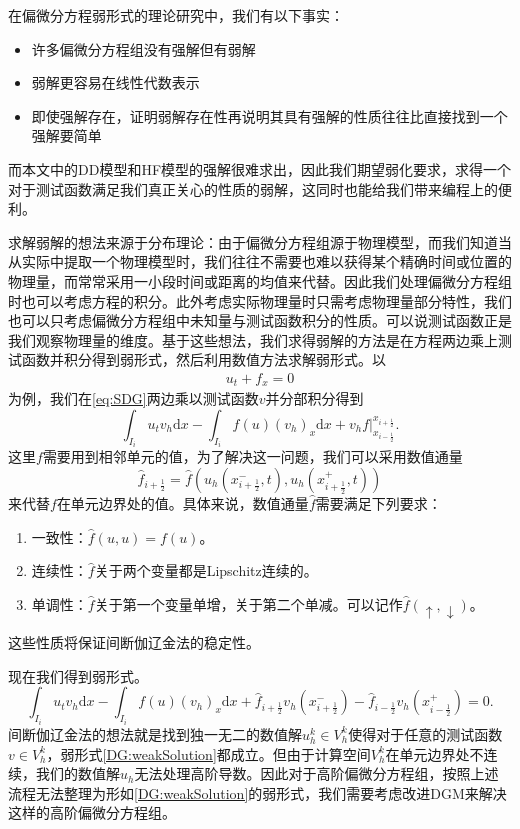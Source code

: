 在偏微分方程弱形式的理论研究中，我们有以下事实\cite{sullivan2020brief}：
\begin{itemize}
    \item 许多偏微分方程组没有强解但有弱解
    \item 弱解更容易在线性代数表示
    \item 即使强解存在，证明弱解存在性再说明其具有强解的性质往往比直接找到一个强解要简单
\end{itemize}
而本文中的DD模型和HF模型的强解很难求出，因此我们期望弱化要求，求得一个对于测试函数满足我们真正关心的性质的弱解，这同时也能给我们带来编程上的便利。

求解弱解的想法来源于分布理论：由于偏微分方程组源于物理模型，而我们知道当从实际中提取一个物理模型时，我们往往不需要也难以获得某个精确时间或位置的物理量，而常常采用一小段时间或距离的均值来代替。因此我们处理偏微分方程组时也可以考虑方程的积分。此外考虑实际物理量时只需考虑物理量部分特性，我们也可以只考虑偏微分方程组中未知量与测试函数积分的性质。可以说测试函数正是我们观察物理量的维度。基于这些想法，我们求得弱解的方法是在方程两边乘上测试函数并积分得到弱形式，然后利用数值方法求解弱形式。以
\begin{align}
    u_t + f_x = 0\label{eq:SDG}
\end{align}
为例，我们在\eqref{eq:SDG}两边乘以测试函数$v$并分部积分得到
\begin{equation}
    \int_{I_i}u_t v_h\mathrm{d}x - \int_{I_i}f(u)(v_h)_x\mathrm{d}x+v_hf\bigg|^{x_{i+\frac{1}{2}}}_{x_{i-\frac{1}{2}}}.
\end{equation}
这里$f$需要用到相邻单元的值，为了解决这一问题，我们可以采用数值通量
\begin{equation*}
    \hat{f}_{i+\frac{1}{2}}=\hat{f}(u_h(x^-_{i+\frac{1}{2}},t),u_h(x^+_{i+\frac{1}{2}},t))
\end{equation*}
来代替$f$在单元边界处的值。具体来说，数值通量$\hat{f}$需要满足下列要求：
\begin{enumerate}
    \item 一致性：$\hat{f}(u,u)=f(u)$。
    \item 连续性：$\hat{f}$关于两个变量都是Lipschitz连续的。
    \item 单调性：$\hat{f}$关于第一个变量单增，关于第二个单减。可以记作$\hat{f}(\uparrow,\downarrow)$。
\end{enumerate}
这些性质将保证间断伽辽金法的稳定性。

现在我们得到弱形式。
\begin{equation}
    \int_{I_i}u_t v_h\mathrm{d}x - \int_{I_i}f(u)(v_h)_x\mathrm{d}x+\hat{f}_{i+\frac{1}{2}}v_h(x^-_{i+\frac{1}{2}})-\hat{f}_{i-\frac{1}{2}}v_h(x^+_{i-\frac{1}{2}}) = 0. \label{DG:weakSolution}
\end{equation}
间断伽辽金法的想法就是找到独一无二的数值解$u_h^k\in V_h^k$使得对于任意的测试函数$v \in V_h^k$，弱形式\eqref{DG:weakSolution}都成立。但由于计算空间$V_h^k$在单元边界处不连续，我们的数值解$u_h$无法处理高阶导数。因此对于高阶偏微分方程组，按照上述流程无法整理为形如\eqref{DG:weakSolution}的弱形式，我们需要考虑改进DGM来解决这样的高阶偏微分方程组。
